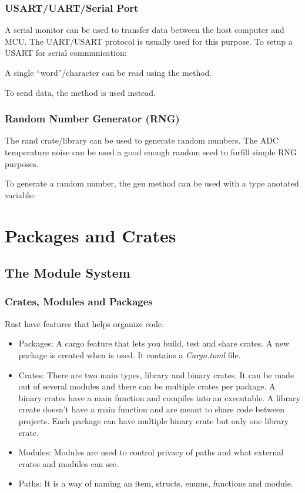 \documentclass{beamer}
\begin{document}
\begin{frame}[allowframebreaks]
  \frametitle{USART/UART/Serial Port}
  A serial monitor can be used to transfer data between the host computer and MCU. The UART/USART protocol is usually used for this purpose. To setup a USART for serial communication:
  
  

  A single ``word''/character can be read using the  method.
  

  To send data, the  method is used instead.
  
\end{frame}

\begin{frame}
  \frametitle{Random Number Generator (RNG)}
  The rand crate/library can be used to generate random numbers. The ADC temperature noise can be used a good enough random seed to forfill simple RNG purposes.
  

  To generate a random number, the gen method can be used with a type anotated variable:
  
\end{frame}

\section{Packages and Crates}
\subsection{The Module System}
\begin{frame} \frametitle{Crates, Modules and Packages} Rust have features that helps organize code.

  \begin{itemize}
    \item{Packages: A cargo feature that lets you build, test and share crates. A new package is created when  is used. It contains a \emph{Cargo.toml} file.}
    \item{Crates: There are two main types, library and binary crates. It can be made out of several modules and there can be multiple crates per package. A binary crates have a main function and compiles into an executable. A library create doesn't have a main function and are meant to share code between projects. Each package can have multiple binary crate but only one library crate.}
    \item{Modules: Modules are used to control privacy of paths and what external crates and modules can see.}
    \item{Paths: It is a way of naming an item, structs, enums, functions and module.}
  \end{itemize}
\end{frame}
\end{document}
